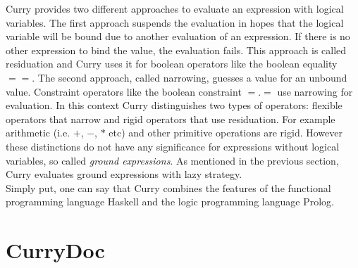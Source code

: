 \documentclass[%
	latex,%
	a4paper,%
	oneside,%
	chapterprefix,%
	headsepline,%
	12pt%
]{scrbook}
\begin{document}

Curry provides two different approaches to evaluate an expression with
logical variables. %
The first approach suspends the evaluation in hopes that the logical
variable will be bound due to another evaluation of an expression. %
If there is no other expression to bind the value, the evaluation
fails. %
This approach is called residuation and Curry uses it for boolean
operators like the boolean equality \ensuremath{==}. %
The second approach, called narrowing, guesses a value for an unbound
value. %
Constraint operators like the boolean constraint \ensuremath{\mathbin{=.=}} use narrowing
for evaluation. %
In this context Curry distinguishes two types of operators: flexible
operators that narrow and rigid operators that use residuation. %
For example arithmetic (i.e. \ensuremath{\mathbin{+}}, \ensuremath{\mathbin{-}}, \ensuremath{\mathbin{*}} etc) and other primitive
operations are rigid. %
However these distinctions do not have any significance for
expressions without logical variables, so called \emph{ground
  expressions}. %
As mentioned in the previous section, Curry evaluates ground
expressions with lazy strategy.\\

Simply put, one can say that Curry combines the features of the
functional programming language Haskell and the logic programming
language Prolog. %

\section{CurryDoc}\label{preliminaries:currydoc}
\end{document}
